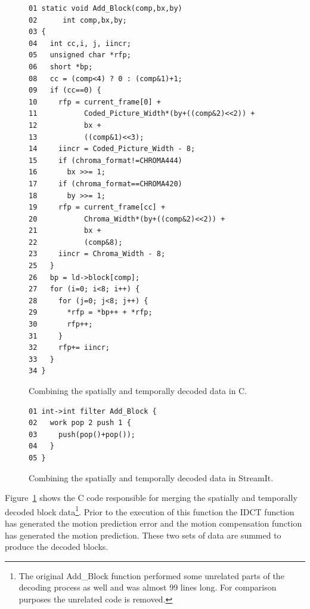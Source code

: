 \begin{figure}
  \begin{center}
    \begin{minipage}{4in}
      \begin{small}
        \begin{verbatim}
01 static void Add_Block(comp,bx,by)
02      int comp,bx,by;
03 {
04   int cc,i, j, iincr;
05   unsigned char *rfp;
06   short *bp;
08   cc = (comp<4) ? 0 : (comp&1)+1;
09   if (cc==0) {
10     rfp = current_frame[0] + 
11           Coded_Picture_Width*(by+((comp&2)<<2)) + 
12           bx + 
13           ((comp&1)<<3);
14     iincr = Coded_Picture_Width - 8;
15     if (chroma_format!=CHROMA444)
16       bx >>= 1;
17     if (chroma_format==CHROMA420)
18       by >>= 1;
19     rfp = current_frame[cc] + 
20           Chroma_Width*(by+((comp&2)<<2)) + 
21           bx + 
22           (comp&8);
23     iincr = Chroma_Width - 8;
25   }
26   bp = ld->block[comp];
27   for (i=0; i<8; i++) {
28     for (j=0; j<8; j++) {
29       *rfp = *bp++ + *rfp;
30       rfp++;
31     }
32     rfp+= iincr;
33   }
34 }
        \end{verbatim}
      \end{small}
    \end{minipage}
  \end{center}
  \caption{Combining the spatially and temporally decoded data in C.}
  \label{fig:add-filter-in-c}
\end{figure}

\begin{figure}
  \begin{center}
    \begin{minipage}{3in}
      \begin{small}
        \begin{verbatim}
01 int->int filter Add_Block {
02   work pop 2 push 1 {
03     push(pop()+pop());
04   }
05 }
        \end{verbatim}
      \end{small}
    \end{minipage}
  \end{center}
  \caption{Combining the spatially and temporally decoded data in StreamIt.}
  \label{fig:add-filter2}
\end{figure}

Figure~\ref{fig:add-filter-in-c} shows the C code responsible for merging the
spatially and temporally decoded block data\footnote{The original Add\_Block function
performed some unrelated parts of the decoding process as well and was almost 99 lines
long. For comparison purposes the unrelated code is removed.}. Prior to the execution of this
function the IDCT function has generated the motion prediction
error and the motion compensation function has generated the motion prediction. 
These two sets of data are summed to produce the decoded blocks.

